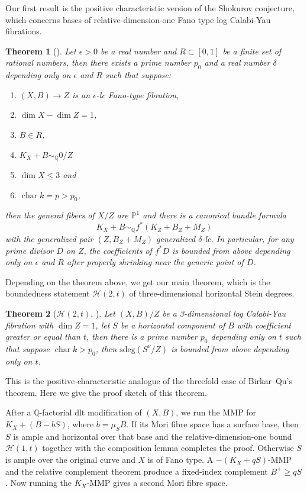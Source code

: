 \documentclass[letterpaper,reqno,12pt]{amsart}
\DeclareMathOperator{\chara}{char}
\numberwithin{equation}{section}
\theoremstyle{plain}
\newtheorem{theorem}{Theorem}[section]
\begin{document}
Our first result is the positive characteristic version of the Shokurov conjecture, which concerns bases of relative-dimension-one Fano type log Calabi-Yau fibrations. 
\begin{theorem}[]
    Let $\epsilon>0$ be a real number and $R\subset [0,1]$ be a finite set of rational numbers, then there exists a prime number $p_0$ and a real number $\delta$ depending only on $\epsilon$ and $R$ such that suppose:
    \begin{enumerate}
        \item $(X,B)\to Z$ is an $\epsilon$-lc Fano-type fibration,
        \item $\dim X-\dim Z=1$,
        \item $B\in R$,
        \item $K_X+B\sim_\mathbb Q 0/Z$
        \item $\dim X\leq 3$ and
        \item $\chara k=p>p_0$,
    \end{enumerate} then the general fibers of $X/Z$ are $\mathbb P^1$ and there is a canonical bundle formula 
    \[K_X+B\sim_\mathbb Q f^*(K_Z+B_Z+M_Z)\]
    with the generalized pair $(Z,B_Z+M_Z)$ generalized $\delta$-lc. In particular, for any prime divisor $D$ on $Z$, the coefficients of $f^*D$ is bounded from above depending only on $\epsilon$ and $R$ after properly shrinking near the generic point of $D$.
\end{theorem}
Depending on the theorem above, we get our main theorem, which is the boundedness statement $\mathcal H(2,t)$ of three-dimensional horizontal Stein degrees. 

\begin{theorem}[$\mathcal H(2,t)$, ]
    Let $(X,B)/Z$ be a 3-dimensional log Calabi-Yau fibration with $\dim Z=1$, let $S$ be a horizontal component of $B$ with coefficient greater or equal than $t$, then there is a prime number $p_0$ depending only on $t$ such that suppose $\chara k>p_0$, then $\text{sdeg}(S^\nu/Z)$ is bounded from above depending only on $t$.
\end{theorem}
This is the positive-characteristic analogue of the threefold case of Birkar--Qu's theorem. Here we give the proof sketch of this theorem.

After a $\mathbb Q$-factorial dlt modification of $(X,B)$, we run the MMP for $K_X+(B-bS)$, where $b=\mu_SB$.  If its Mori fibre space has a surface base, then $S$ is ample and horizontal over that base and the relative-dimension-one bound $\mathcal H(1,t)$ together with the composition lemma completes the proof.  Otherwise $S$ is ample over the original curve and $X$ is of Fano type.  A $-(K_X+qS)$-MMP and the relative complement theorem produce a fixed-index complement $B^+\ge qS$. Now running the $K_X$-MMP gives a second Mori fibre space.
\end{document}
